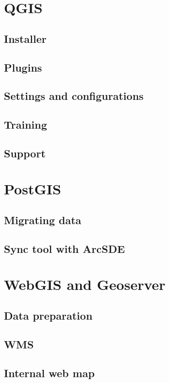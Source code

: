\section{QGIS}

\subsection{Installer}


\subsection{Plugins}


\subsection{Settings and configurations}


\subsection{Training}


\subsection{Support}

\section{PostGIS}

\subsection{Migrating data}
\subsection{Sync tool with ArcSDE}

\section{WebGIS and Geoserver}
\subsection{Data preparation}
\subsection{WMS}
\subsection{Internal web map}

